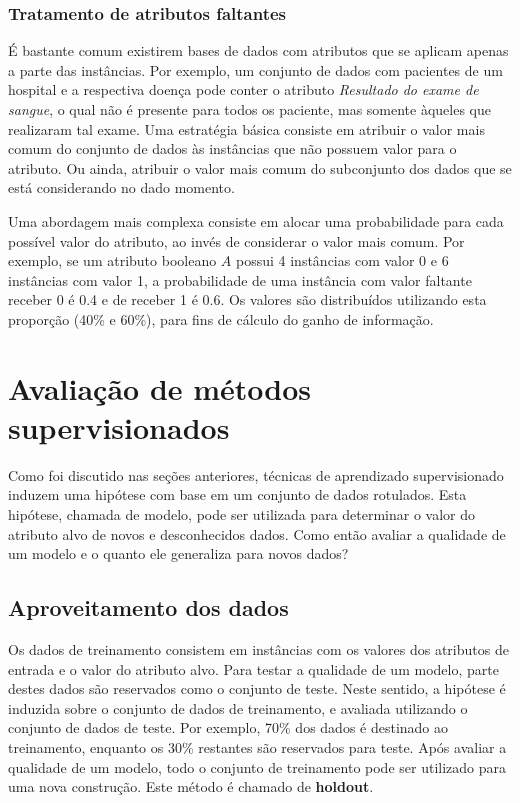 \subsubsection{Tratamento de atributos faltantes}

É bastante comum existirem bases de dados com atributos que se aplicam apenas a parte das instâncias. Por exemplo, um conjunto de dados com pacientes de um hospital e a respectiva doença pode conter o atributo \textit{Resultado do exame de sangue}, o qual não é presente para todos os paciente, mas somente àqueles que realizaram tal exame. Uma estratégia básica consiste em atribuir o valor mais comum do conjunto de dados às instâncias que não possuem valor para o atributo. Ou ainda, atribuir o valor mais comum do subconjunto dos dados que se está considerando no dado momento.

Uma abordagem mais complexa consiste em alocar uma probabilidade para cada possível valor do atributo, ao invés de considerar o valor mais comum. Por exemplo, se um atributo booleano $A$ possui 4 instâncias com valor 0 e 6 instâncias com valor 1, a probabilidade de uma instância com valor faltante receber 0 é 0.4 e de receber 1 é 0.6. Os valores são distribuídos utilizando esta proporção (40\% e 60\%), para fins de cálculo do ganho de informação.

\section{Avaliação de métodos supervisionados}

Como foi discutido nas seções anteriores, técnicas de aprendizado supervisionado induzem uma hipótese com base em um conjunto de dados rotulados. Esta hipótese, chamada de modelo, pode ser utilizada para determinar o valor do atributo alvo de novos e desconhecidos dados. Como então avaliar a qualidade de um modelo e o quanto ele generaliza para novos dados?

\subsection{Aproveitamento dos dados}

Os dados de treinamento consistem em instâncias com os valores dos atributos de entrada e o valor do atributo alvo. Para testar a qualidade de um modelo, parte destes dados são reservados como o conjunto de teste. Neste sentido, a hipótese é induzida sobre o conjunto de dados de treinamento, e avaliada utilizando o conjunto de dados de teste. Por exemplo, 70\% dos dados é destinado ao treinamento, enquanto os 30\% restantes são reservados para teste. Após avaliar a qualidade de um modelo, todo o conjunto de treinamento pode ser utilizado para uma nova construção. Este método é chamado de \textbf{holdout}.

